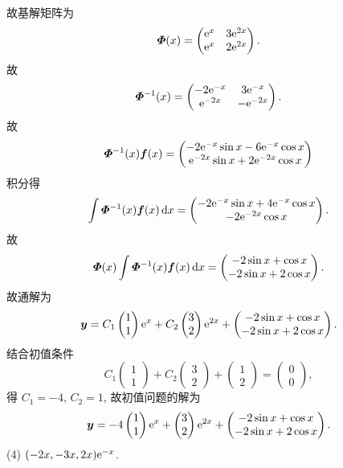 \begin{solution}
  故基解矩阵为
  \[\bm{\varPhi}(x)=\begin{pmatrix}\mathrm{e}^x&3\mathrm{e}^{2x}\\\mathrm{e}^x&2\mathrm{e}^{2x}\end{pmatrix}.\]
  故
  \[\bm{\varPhi}^{-1}(x)=\begin{pmatrix}-2\mathrm{e}^{-x}&3\mathrm{e}^{-x}\\\mathrm{e}^{-2x}&-\mathrm{e}^{-2x}\end{pmatrix}.\]
  故
  \[\bm{\varPhi}^{-1}(x)\bm{f}(x) =
    \begin{pmatrix}-2\mathrm{e}^{-x}\sin x-6\mathrm{e}^{-x}\cos x\\\mathrm{e}^{-2x}\sin x+2\mathrm{e}^{-2x}\cos x\end{pmatrix}\]
  积分得
  \[\int\bm{\varPhi}^{-1}(x)\bm{f}(x)\mathop{}\!\mathrm{d} x =
    \begin{pmatrix}-2\mathrm{e}^{-x}\sin x+4\mathrm{e}^{-x}\cos x\\-2\mathrm{e}^{-2x}\cos x\end{pmatrix}.\]
  故
  \[\bm{\varPhi}(x)\int\bm{\varPhi}^{-1}(x)\bm{f}(x)\mathop{}\!\mathrm{d} x =
    \begin{pmatrix}-2\sin x+\cos x\\-2\sin x+2\cos x\end{pmatrix}.\]
  故通解为
  \[\bm{y} = C_1\begin{pmatrix}1\\1\end{pmatrix}\mathrm{e}^x
    + C_2\begin{pmatrix}3\\2\end{pmatrix}\mathrm{e}^{2x}
    + \begin{pmatrix}-2\sin x+\cos x\\-2\sin x+2\cos x\end{pmatrix}.\]
  结合初值条件
  \[C_1\begin{pmatrix}1\\1\end{pmatrix}
    + C_2\begin{pmatrix}3\\2\end{pmatrix}
    + \begin{pmatrix}1\\2\end{pmatrix}
    = \begin{pmatrix}0\\0\end{pmatrix},\]
  得 $C_1=-4$, $C_2=1$, 故初值问题的解为
  \[\bm{y} =
    - 4\begin{pmatrix}1\\1\end{pmatrix}\mathrm{e}^x
    + \begin{pmatrix}3\\2\end{pmatrix}\mathrm{e}^{2x}
    + \begin{pmatrix}-2\sin x+\cos x\\-2\sin x+2\cos x\end{pmatrix}.\]
  (4) $(-2x,-3x,2x)\mathrm{e}^{-x}$.
\end{solution}



